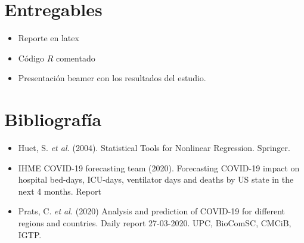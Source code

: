 \documentclass[11pt]{article}
\begin{document}
\section{Entregables}  \label{Entregables}

\begin{itemize}
\item Reporte en latex
\item C\'odigo $R$ comentado
\item Presentaci\'on beamer con los resultados del estudio.
\end{itemize}








\section{Bibliograf\'ia}  \label{Bibliografia}


\begin{itemize}
\item Huet, S. \textit{et al.} (2004). Statistical Tools for Nonlinear Regression. Springer.  

\item IHME COVID-19 forecasting team (2020). Forecasting COVID-19 impact on hospital bed-days, ICU-days, ventilator days
and deaths by US state in the next 4 months. Report

\item Prats, C. \textit{et al.} (2020) Analysis and prediction of COVID-19 for
different regions and countries. Daily report 27-03-2020. UPC, BioComSC, CMCiB, 
IGTP.  
\end{itemize}
\end{document}

